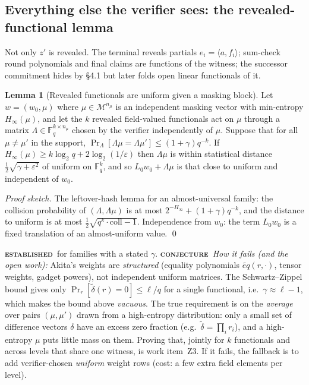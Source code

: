 \documentclass[11pt]{article}
\newcommand{\epitag}[3]{\colorbox{#2}{\textcolor{#1}{\textsc{\footnotesize\bfseries #3}}}}
\newcommand{\established}{\epitag{estgreen}{estbg}{established}}
\newcommand{\conjectureTag}{\epitag{conjyellow}{conjbg}{conjecture}}
\renewcommand{\_}{\textunderscore\allowbreak{}}
\theoremstyle{definition}
\newtheorem{lemma}[definition]{Lemma}
\begin{document}
\subsection{Everything else the verifier sees: the revealed-functional lemma}
Not only $z'$ is revealed. The terminal reveals partials $e_i=\langle a,f_i\rangle$; sum-check round polynomials and final claims are functions of the witness; the successor commitment hides by \S4.1 but later folds open linear functionals of it.
\begin{lemma}[Revealed functionals are uniform given a masking block]
\label{lem:revealed}
Let $w=(w_0,\mu)$ where $\mu\in\mathcal{M}^{n_\mu}$ is an independent masking vector with min-entropy $H_\infty(\mu)$, and let the $k$ revealed field-valued functionals act on $\mu$ through a matrix $\Lambda\in\mathbb{F}_q^{k\times n_\mu}$ chosen by the verifier independently of $\mu$. Suppose that for all $\mu\ne\mu'$ in the support, $\Pr_\Lambda[\Lambda\mu=\Lambda\mu']\le(1+\gamma)q^{-k}$. If $H_\infty(\mu)\ge k\log_2q+2\log_2(1/\varepsilon)$ then $\Lambda\mu$ is within statistical distance $\tfrac12\sqrt{\gamma+\varepsilon^2}$ of uniform on $\mathbb{F}_q^k$, and so $L_0w_0+\Lambda\mu$ is that close to uniform and independent of $w_0$.
\end{lemma}
\begin{proof}[Proof sketch]
The leftover-hash lemma for an almost-universal family: the collision probability of $(\Lambda,\Lambda\mu)$ is at most $2^{-H_\infty}+(1+\gamma)q^{-k}$, and the distance to uniform is at most $\tfrac12\sqrt{q^k\cdot\mathrm{coll}-1}$. Independence from $w_0$: the term $L_0w_0$ is a fixed translation of an almost-uniform value. \qed
\end{proof}
\established\ for families with a stated $\gamma$. \conjectureTag\ \textit{How it fails (and the open work):} Akita's weights are \emph{structured} (equality polynomials $\widetilde{eq}(r,\cdot)$, tensor weights, gadget powers), not independent uniform matrices. The Schwartz--Zippel bound gives only $\Pr_r[\widetilde\delta(r)=0]\le\ell/q$ for a single functional, i.e.\ $\gamma\approx\ell-1$, which makes the bound above \emph{vacuous}. The true requirement is on the \emph{average} over pairs $(\mu,\mu')$ drawn from a high-entropy distribution: only a small set of difference vectors $\delta$ have an excess zero fraction (e.g.\ $\widetilde\delta=\prod_ir_i$), and a high-entropy $\mu$ puts little mass on them. Proving that, jointly for $k$ functionals and across levels that share one witness, is work item~Z3. If it fails, the fallback is to add verifier-chosen \emph{uniform} weight rows (cost: a few extra field elements per level).
\end{document}
